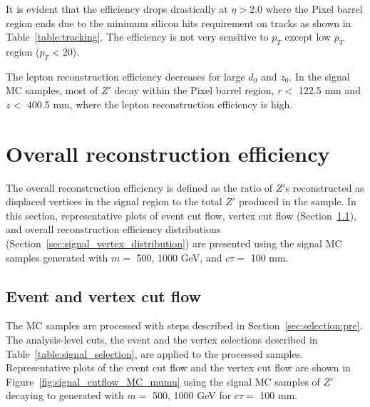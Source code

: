 It is evident that the efficiency drops drastically at $\eta > 2.0$ where the Pixel barrel region ends due to the minimum silicon hits requirement on tracks as shown in Table~\ref{table:tracking}. The efficiency is not very sensitive to $p_{T}$ except low $p_{T}$ region ($p_{T} < 20$).

The lepton reconstruction efficiency decreases for large $d_{0}$ and $z_{0}$. In the signal MC samples, most of $Z'$ decay within the Pixel barrel region, $r < $ 122.5 mm and $z < $ 400.5 mm, where the lepton reconstruction efficiency is high.

\section{Overall reconstruction efficiency}
\label{sec:combined_reco_efficiency}
The overall reconstruction efficiency is defined as the ratio of $Z'$s reconstructed as displaced vertices in the signal region to the total $Z'$ produced in the sample. In this section, representative plots of event cut flow, vertex cut flow (Section~\ref{sec:signal_cutflow}), and overall reconstruction efficiency distributions (Section~\ref{sec:signal_vertex_distribution}) are presented using the signal MC samples generated with $m=$ 500, 1000 GeV, and $c\tau=$ 100 mm.



\subsection{Event and vertex cut flow}
\label{sec:signal_cutflow}
The MC samples are processed with steps described in Section~\ref{sec:selection:pre}. The analysis-level cuts, the event and the vertex selections described in Table~\ref{table:signal_selection}, are applied to the processed samples. Representative plots of the event cut flow and the vertex cut flow are shown in Figure~\ref{fig:signal_cutflow_MC_mumu} using the signal MC samples of $Z'$ decaying to \mumu generated with $m=$ 500, 1000 GeV for $c\tau=$ 100 mm.

